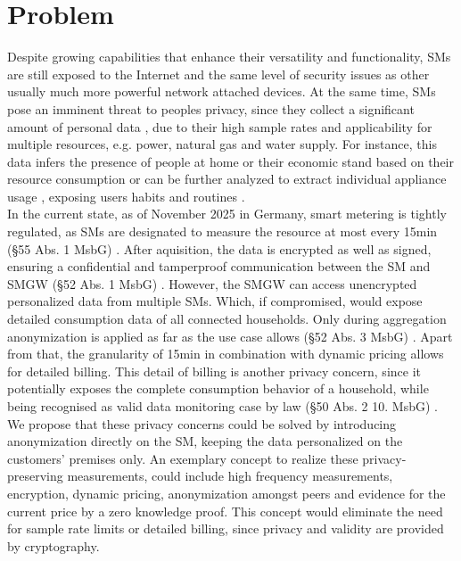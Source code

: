 \documentclass[english]{tudscrartcl}
\begin{document}
	\section{Problem}
	\normalsize
	Despite growing capabilities that enhance their versatility and functionality,
	SMs are still exposed to the Internet and the same level of security issues as other usually much more powerful network attached devices. 
	At the same time, SMs pose an imminent threat to peoples privacy, since they collect a significant amount of personal data \cite{7959167},
	due to their high sample rates and applicability for multiple resources, e.g. power, natural gas and water supply.
	For instance, this data infers the presence of people at home or their economic stand based on their resource consumption \cite{7959167}
	or can be further analyzed to extract individual appliance usage \cite{20101011}, exposing users habits and routines \cite{20101011}.
	\\ %
	In the current state, as of November 2025 in Germany, smart metering is tightly regulated,
	as SMs are designated to measure the resource at most every 15min (§55 Abs. 1 MsbG) \cite{Msbg55}.
	After aquisition, the data is encrypted as well as signed, ensuring a confidential
	and tamperproof communication between the SM and SMGW (§52 Abs. 1 MsbG) \cite{Msbg52}.
	However, the SMGW can access unencrypted personalized data from multiple SMs.
	Which, if compromised, would expose detailed consumption data of all connected households.
	Only during aggregation anonymization is applied as far as the use case allows (§52 Abs. 3 MsbG) \cite{Msbg52}.
	Apart from that, the granularity of 15min in combination with dynamic pricing allows for detailed billing.
	This detail of billing is another privacy concern, since it potentially exposes the complete consumption behavior of a household,
	while being recognised as valid data monitoring case by law (§50 Abs. 2 10. MsbG) \cite{Msbg50}.
	\\ %
	We propose that these privacy concerns could be solved by introducing anonymization directly on the SM,
	keeping the data personalized on the customers' premises only. 
	An exemplary concept to realize these privacy-preserving measurements, could include high frequency measurements, encryption, dynamic pricing,
	anonymization amongst peers and evidence for the current price by a zero knowledge proof.
	This concept would eliminate the need for sample rate limits or detailed billing, since privacy and validity are provided by cryptography.
\end{document}
